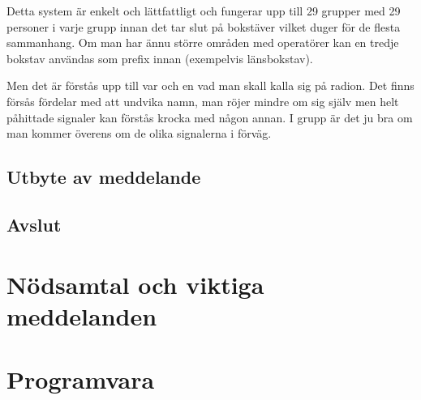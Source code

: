 Detta system är enkelt och lättfattligt och fungerar upp till 29 grupper med 29 personer i varje grupp innan det tar slut på bokstäver vilket duger för de flesta sammanhang. Om man har ännu större områden med operatörer kan en tredje bokstav användas som prefix innan (exempelvis länsbokstav).

Men det är förstås upp till var och en vad man skall kalla sig på radion. Det finns försås fördelar med att undvika namn, man röjer mindre om sig själv men helt påhittade signaler kan förstås krocka med någon annan. I grupp är det ju bra om man kommer överens om de olika signalerna i förväg.


\subsection{Utbyte av meddelande}

\subsection{Avslut}

\section{Nödsamtal och viktiga meddelanden}

\section{Programvara}
